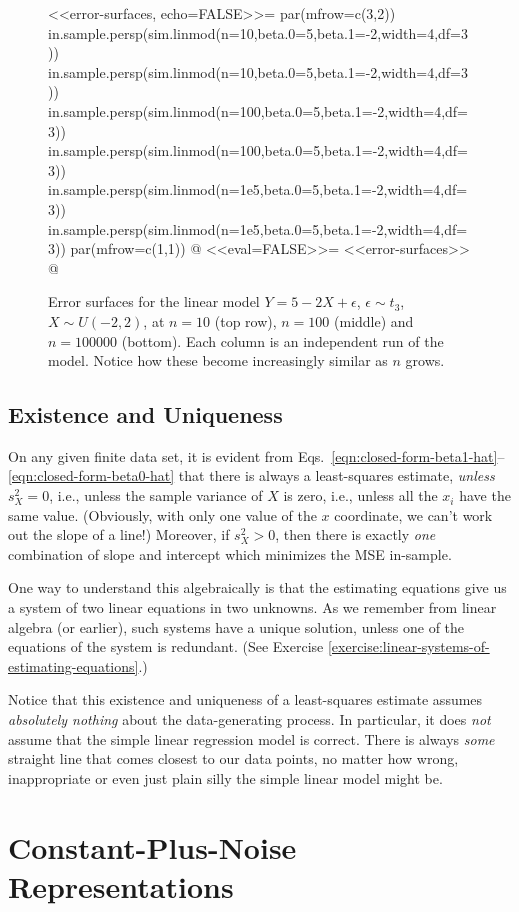 \documentclass{article}
\begin{document}
\begin{figure}
<<error-surfaces, echo=FALSE>>=
par(mfrow=c(3,2))
in.sample.persp(sim.linmod(n=10,beta.0=5,beta.1=-2,width=4,df=3))
in.sample.persp(sim.linmod(n=10,beta.0=5,beta.1=-2,width=4,df=3))
in.sample.persp(sim.linmod(n=100,beta.0=5,beta.1=-2,width=4,df=3))
in.sample.persp(sim.linmod(n=100,beta.0=5,beta.1=-2,width=4,df=3))
in.sample.persp(sim.linmod(n=1e5,beta.0=5,beta.1=-2,width=4,df=3))
in.sample.persp(sim.linmod(n=1e5,beta.0=5,beta.1=-2,width=4,df=3))
par(mfrow=c(1,1))
@
<<eval=FALSE>>=
<<error-surfaces>>
@
\caption{Error surfaces for the linear model $Y=5-2X+\epsilon$, $\epsilon \sim
  t_3$, $X \sim U(-2,2)$, at $n=10$ (top row), $n=100$ (middle) and $n=100000$
  (bottom).  Each column is an independent run of the model.  Notice how these
  become increasingly similar as $n$ grows.}
\label{fig:error-surfaces}
\end{figure}

\subsection{Existence and Uniqueness}

On any given finite data set, it is evident from Eqs.\
\ref{eqn:closed-form-beta1-hat}--\ref{eqn:closed-form-beta0-hat} that there is
always a least-squares estimate, {\em unless} $s^2_X = 0$, i.e., unless the
sample variance of $X$ is zero, i.e., unless all the $x_i$ have the same value.
(Obviously, with only one value of the $x$ coordinate, we can't work out the
slope of a line!)  Moreover, if $s^2_X > 0$, then there is exactly {\em one}
combination of slope and intercept which minimizes the MSE in-sample.

One way to understand this algebraically is that the estimating equations give
us a system of two linear equations in two unknowns.  As we remember from
linear algebra (or earlier), such systems have a unique solution, unless one of
the equations of the system is redundant.  (See Exercise
\ref{exercise:linear-systems-of-estimating-equations}.)

Notice that this existence and uniqueness of a least-squares estimate assumes
{\em absolutely nothing} about the data-generating process.  In particular, it
does {\em not} assume that the simple linear regression model is correct.
There is always {\em some} straight line that comes closest to our data points,
no matter how wrong, inappropriate or even just plain silly the simple linear
model might be.


\section{Constant-Plus-Noise Representations}
\end{document}
